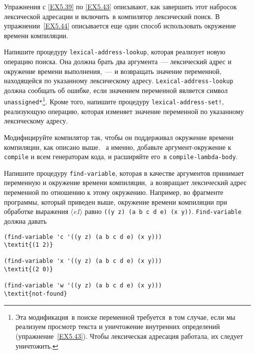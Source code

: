 Упражнения с \ref{EX5.39} по 
\ref{EX5.43} описывают, как завершить этот набросок
лексической адресации и включить~в компилятор лексический поиск.  В
упражнении~\ref{EX5.44} описывается еще один способ
использовать окружение времени компиляции.
\begin{exercise}{5.39}%
\label{EX5.39}%
Напишите процедуру {\tt lexical-address-lookup},
которая реализует новую операцию поиска.  Она должна брать два
аргумента~--- лексический адрес и окружение времени выполнения,~--- и
возвращать значение переменной, находящейся по указанному лексическому
адресу.  {\tt Lexical-address-lookup} должна сообщать об
ошибке, если значением переменной является символ
{\tt *unassigned*}\footnote{Эта модификация~в поиске переменной требуется~в том
случае, если мы реализуем   просмотр текста и уничтожение внутренних
определений (упражнение~\ref{EX5.43}).  Чтобы лексическая
адресация работала, их следует уничтожить.
}.
Кроме того, напишите процедуру {\tt lexical-address-set!},
реализующую операцию, которая изменяет значение переменной по
указанному лексическому адресу.
\end{exercise}
\begin{exercise}{5.40}%
\label{EX5.40}%
Модифицируйте компилятор так, чтобы он поддерживал
окружение времени компиляции, как описано выше. ~а именно,
добавьте аргумент-окружение к {\tt compile} и всем генераторам
кода, и расширяйте его~в {\tt compile-lambda-body}.
\end{exercise}
\begin{exercise}{5.41}%
\label{EX5.41}%
Напишите процедуру {\tt find-variable}, которая в
качестве аргументов принимает переменную и окружение времени
компиляции,~а возвращает лексический адрес переменной по отношению к
этому окружению.  Например, во фрагменте программы, который приведен
выше, окружение времени компиляции при обработке выражения
\textit{$\langle$e1$\rangle$} равно {\tt ((y z) (a b c d e) (x y))}.
{\tt Find-variable} должна давать

\begin{Verbatim}[fontsize=\small]
(find-variable 'c '((y z) (a b c d e) (x y)))
\textit{(1 2)}

(find-variable 'x '((y z) (a b c d e) (x y)))
\textit{(2 0)}

(find-variable 'w '((y z) (a b c d e) (x y)))
\textit{not-found}
\end{Verbatim}
\end{exercise}
